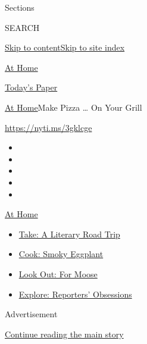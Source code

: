 Sections

SEARCH

\protect\hyperlink{site-content}{Skip to
content}\protect\hyperlink{site-index}{Skip to site index}

\href{https://www.nytimes.com/spotlight/at-home}{At Home}

\href{https://myaccount.nytimes.com/auth/login?response_type=cookie\&client_id=vi}{}

\href{https://www.nytimes.com/section/todayspaper}{Today's Paper}

\href{/spotlight/at-home}{At Home}\textbar{}Make Pizza \ldots{} On Your
Grill

\url{https://nyti.ms/3gklcge}

\begin{itemize}
\item
\item
\item
\item
\item
\end{itemize}

\href{https://www.nytimes.com/spotlight/at-home?action=click\&pgtype=Article\&state=default\&region=TOP_BANNER\&context=at_home_menu}{At
Home}

\begin{itemize}
\tightlist
\item
  \href{https://www.nytimes.com/2020/07/28/books/time-for-a-literary-road-trip.html?action=click\&pgtype=Article\&state=default\&region=TOP_BANNER\&context=at_home_menu}{Take:
  A Literary Road Trip}
\item
  \href{https://www.nytimes.com/2020/07/29/magazine/bored-with-your-home-cooking-some-smoky-eggplant-will-fix-that.html?action=click\&pgtype=Article\&state=default\&region=TOP_BANNER\&context=at_home_menu}{Cook:
  Smoky Eggplant}
\item
  \href{https://www.nytimes.com/2020/07/27/travel/moose-michigan-isle-royale.html?action=click\&pgtype=Article\&state=default\&region=TOP_BANNER\&context=at_home_menu}{Look
  Out: For Moose}
\item
  \href{https://www.nytimes.com/interactive/2020/at-home/even-more-reporters-editors-diaries-lists-recommendations.html?action=click\&pgtype=Article\&state=default\&region=TOP_BANNER\&context=at_home_menu}{Explore:
  Reporters' Obsessions}
\end{itemize}

Advertisement

\protect\hyperlink{after-top}{Continue reading the main story}

